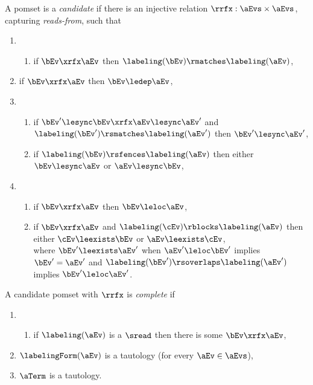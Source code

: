 \begin{definition}
  A pomset is a \emph{candidate} if there is an injective relation
  ${\rrfx} : \aEvs\times\aEvs$, capturing \emph{reads-from}, such that
  \begin{enumerate}[,label=(\textsc{c}\arabic*),ref=\textsc{c}\arabic*]
    \setcounter{enumi}{\value{lambda}}
  \item[] 
    \begin{enumerate}[leftmargin=0pt]
    \item \label{cand-rf}
      if $\bEv\xrfx\aEv$ then $\labeling(\bEv) \rmatches \labeling(\aEv)$,
    \end{enumerate}
    \setcounter{enumi}{\value{Bledep}}
  \item \label{cand-ledep-rf}
    if $\bEv\xrfx\aEv$ then $\bEv \ledep \aEv$,
    \setcounter{enumi}{\value{lesync}}
  \item[] 
    \begin{enumerate}[leftmargin=0pt]
    \item \label{cand-lesync-rf}
      if $\bEv'\lesync\bEv\xrfx\aEv\lesync\aEv'$ and $\labeling(\bEv') \rsmatches \labeling(\aEv')$ then $\bEv' \lesync \aEv'$,
    \item \label{cand-lesync-sc}
      if $\labeling(\bEv) \rsfences \labeling(\aEv)$ then either $\bEv\lesync\aEv$ or $\aEv\lesync\bEv$, 
    \end{enumerate}
    \setcounter{enumi}{\value{leloc}}
  \item[] 
    \begin{enumerate}[leftmargin=0pt]
    \item  \label{cand-leloc-rf}
      if $\bEv\xrfx\aEv$ then $\bEv \leloc \aEv$,
    \item \label{cand-leloc-block}
      if $\bEv\xrfx\aEv$ and $\labeling(\cEv) \rblocks \labeling(\aEv)$ then either $\cEv\leexists\bEv$ or $\aEv\leexists\cEv$,\\
      where $\bEv'\leexists\aEv'$ when $\aEv'\leloc\bEv'$ implies $\bEv'=\aEv'$ and
      $\labeling(\bEv') \rsoverlaps \labeling(\aEv')$ implies $\bEv'\leloc\aEv'$.
    \end{enumerate}
  \end{enumerate}

  A candidate pomset with $\rrfx$ is \emph{complete} if
  \begin{enumerate}[,label=(\textsc{c}\arabic*),ref=\textsc{c}\arabic*]
    \setcounter{enumi}{\value{lambda}}
  \item[] 
    \begin{enumerate}[leftmargin=0pt]
    \item \label{top-rf}
      if $\labeling(\aEv)$ is a $\sread$ then there is some $\bEv\xrfx\aEv$,
    \end{enumerate}
    \setcounter{enumi}{\value{Bkappa}}
  \item \label{top-kappa}
    $\labelingForm(\aEv)$ is a tautology (for every $\aEv\in\aEvs$),
    \setcounter{enumi}{\value{Bterm}}
  \item \label{top-term}
    $\aTerm$ is a tautology.
  \end{enumerate}
\end{definition}

